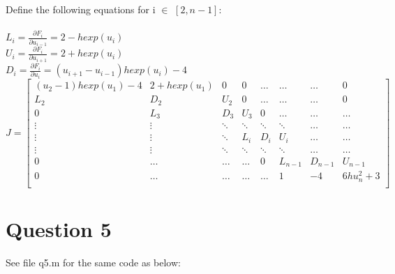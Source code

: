 \documentclass[fleqn]{report}
\begin{document}
Define the following equations for i $\in$ $[2, n-1]$:\\\\
\indent $L_i = \frac{\partial F_i}{\partial u_{i-1}} = 2 - hexp(u_i)$\\ 
\indent $U_i = \frac{\partial F_i}{\partial u_{i+1}} = 2 + hexp(u_i)$\\
\indent $D_i = \frac{\partial F_i}{\partial u_i} =  (u_{i+1} - u_{i-1})hexp(u_i) -4$\\

\[
 J=
\left[ {\begin{array}{cccccccc}
(u_2 - 1)hexp(u_1) - 4 & 2 +hexp(u_1) & 0 & 0 & \hdots & \hdots & \hdots & 0 \\
L_2 & D_2 & U_2 & 0 & \hdots & \hdots & \hdots & 0 \\ 
0 & L_3 & D_3 & U_3 & 0 & \hdots & \hdots & \hdots \\
\vdots & \vdots & \ddots & \ddots & \ddots & \ddots & \hdots & \hdots\\
\vdots & \vdots & \ddots & L_i & D_i  & U_i & \hdots & \hdots \\
\vdots & \vdots & \ddots & \ddots & \ddots & \ddots & \hdots & \hdots \\
0 & \hdots & \hdots & \hdots & 0 & L_{n-1} & D_{n-1} & U_{n-1} \\
0 & \hdots & \hdots & \hdots & \hdots & 1 & -4 & 6hu^2_n + 3\\
  \end{array} } \right]
\]

\newpage
\section{Question 5}
See file q5.m for the same code as below:

\end{document}
